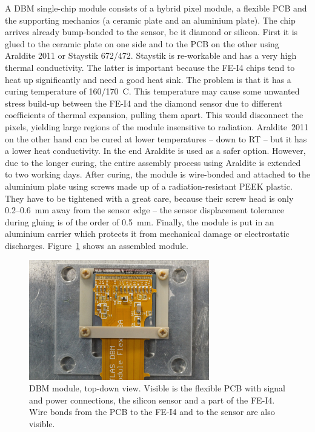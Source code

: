 A DBM single-chip module consists of a hybrid pixel module, a flexible PCB and the supporting mechanics (a ceramic plate and an aluminium plate). The chip arrives already bump-bonded to the sensor, be it diamond or silicon. First it is glued to the ceramic plate on one side and to the PCB on the other using Araldite 2011 or Staystik 672/472. 
Staystik is re-workable and has a very high thermal conductivity. The latter is important because the FE-I4 chips tend to heat up significantly and need a good heat sink. The problem is that it has a curing temperature of 160/170~\textdegree C. This temperature may cause some unwanted stress build-up between the FE-I4 and the diamond sensor due to different coefficients of thermal expansion, pulling them apart. This would disconnect the pixels, yielding large regions of the module insensitive to radiation. Araldite~2011 on the other hand can be cured at lower temperatures -- down to RT -- but it has a lower heat conductivity. In the end Araldite is used as a safer option. However, due to the longer curing, the entire assembly process using Araldite is extended to two working days. After curing, the module is wire-bonded and attached to the aluminium plate using screws made up of a radiation-resistant PEEK plastic. They have to be tightened with a great care, because their screw head is only 0.2--0.6~mm away from the sensor edge -- the sensor displacement tolerance during gluing is of the order of 0.5~mm. Finally, the module is put in an aluminium carrier which protects it from mechanical damage or electrostatic discharges. Figure~\ref{fig:completedmod} shows an assembled module.


\begin{figure}[!t]
\centering
\includegraphics[width=0.7\textwidth]{04_charge_monitoring/pics/mod1}
\caption{DBM module, top-down view. Visible is the flexible PCB with signal and power connections, the silicon sensor and a part of the FE-I4. Wire bonds from the PCB to the FE-I4 and to the sensor are also visible.}
\label{fig:completedmod}
\end{figure}



